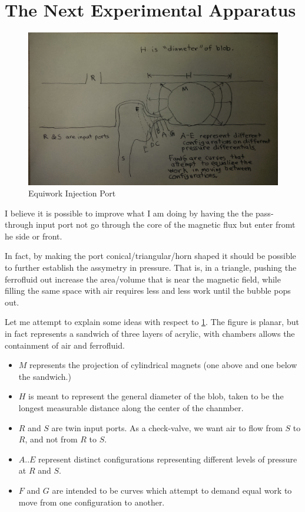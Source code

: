 \documentclass{article}
\begin{document}
\section{The Next Experimental Apparatus}


\begin{figure}
  \centering
     \includegraphics[width=1.0\textwidth]{CurvedInjection.jpg}
     \caption{Equiwork Injection Port}
  \label{fig:closeup}     
\end{figure}


I believe it is possible to improve what I am doing by having the the pass-through input port not go through the core of the magnetic
flux but enter fromt he side or front.

In fact, by making the port conical/triangular/horn shaped it should be possible to further establish the assymetry in pressure.
That is, in a triangle, pushing the ferrofluid out increase the area/volume that is near the magnetic field, while filling the
same space with air requires less and less work until the bubble pops out.


Let me attempt to explain some ideas with respect to \ref{fig:closeup}.
The figure is planar, but in fact represents a sandwich of three layers of acrylic, with chambers allows the containment of air
and ferrofluid.
\begin{itemize}
\item $M$ represents the projection of cylindrical magnets (one above and one below the sandwich.)
\item $H$ is meant to represent the general diameter of the blob, taken to be the longest measurable distance along
  the center of the chanmber.
\item $R$ and $S$ are twin input ports. As a check-valve, we want air to flow from $S$ to $R$, and not from $R$ to $S$.
\item $A..E$ represent distinct configurations representing different levels of pressure at $R$ and $S$.
  \item $F$ and $G$ are intended to be curves which attempt to demand equal work to move from one configuration to another.
  \end{itemize}
\end{document}
